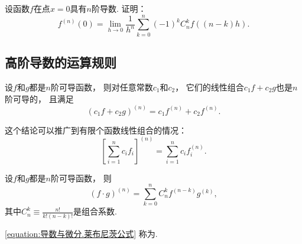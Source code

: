 \begin{example}
设函数\(f\)在点\(x=0\)具有\(n\)阶导数.
证明：\begin{equation}\label{equation:高阶导数.高阶导数与差分的联系}
	f^{(n)}(0)
	= \lim_{h\to0} \frac1{h^n} \sum_{k=0}^n (-1)^k C_n^k f((n-k)h).
\end{equation}
\end{example}

\subsection{高阶导数的运算规则}
\begin{theorem}
设\(f\)和\(g\)都是\(n\)阶可导函数，
则对任意常数\(c_1\)和\(c_2\)，
它们的线性组合\(c_1 f + c_2 g\)也是\(n\)阶可导的，
且满足\begin{equation}
	(c_1 f + c_2 g)^{(n)}
	= c_1 f^{(n)} + c_2 f^{(n)}.
\end{equation}
\end{theorem}

这个结论可以推广到有限个函数线性组合的情况：\begin{equation}
	\left[ \sum_{i=1}^n c_i f_i \right]^{(n)}
	= \sum_{i=1}^n c_i f_i^{(n)}.
\end{equation}

\begin{theorem}
设\(f\)和\(g\)都是\(n\)阶可导函数，
则\begin{equation}\label{equation:导数与微分.莱布尼茨公式}
	(f \cdot g)^{(n)}
	= \sum_{k=0}^n C_n^k f^{(n-k)} g^{(k)},
\end{equation}
其中\(C_n^k \equiv \frac{n!}{k! (n-k)!}\)是组合系数.
\end{theorem}
\cref{equation:导数与微分.莱布尼茨公式} 称为.

